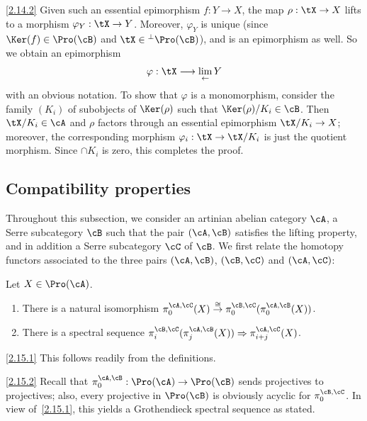 \begin{proofc}
\begin{laststep}{\eqref{2.14.2}}
Given such an essential epimorphism $f : Y \to X$, the map $\rho : \tX \to X$ lifts to a morphism $\varphi_Y : \tX \to Y$. Moreover, $\varphi_Y$ is unique (since $\Ker(f) \in \Pro(\cB)$ and $\tX \in {^{\perp} \Pro(\cB)}$), and is an epimorphism as well. So we obtain an epimorphism
\[
\varphi : \tX \longrightarrow
\lim_{\leftarrow} Y
\]
with an obvious notation. To show that $\varphi$ is a monomorphism, consider the family $(K_i)$ of subobjects of $\Ker(\rho)$ such that $\Ker(\rho)/K_i \in \cB$. Then $\tX/K_i \in \cA$ and $\rho$ factors through an essential epimorphism $\tX/K_i \to X$; moreover, the corresponding morphism $\varphi_i : \tX \to \tX/K_i$ is just the quotient morphism. Since $\cap K_i$ is zero, this completes the proof.
\end{laststep}
\let\qed\relax
\end{proofc}

\subsection{Compatibility properties}\label{subsec:compatibility}

Throughout this subsection, we consider an artinian abelian category $\cA$, a Serre subcategory $\cB$ such that the pair $(\cA,\cB)$ satisfies the lifting property, and in addition a Serre subcategory $\cC$ of $\cB$. We first relate the homotopy functors associated to the three pairs $(\cA,\cB)$, $(\cB,\cC)$ and $(\cA,\cC)$:

\begin{lemm}\label{lem:comp}
Let $X \in \Pro(\cA)$.
\begin{enumerate}\romanenumi
\item \label{2.15.1} There is a natural isomorphism $\pi_0^{\cA,\cC}(X) \stackrel{\cong}{\to}
\pi_0^{\cB,\cC} (\pi_0^{\cA,\cB}(X))$.
\item \label{2.15.2} There is a spectral sequence $\pi_i^{\cB,\cC} (\pi_j^{\cA,\cB}(X)) \Rightarrow
\pi_{i+j}^{\cA,\cC}(X)$.
\end{enumerate}
\end{lemm}

\begin{proofc}
\begin{step}{\eqref{2.15.1}}%
This follows readily from the definitions.
\end{step}

\begin{laststep}{\eqref{2.15.2}}%
Recall that $\pi_0^{\cA,\cB} : \Pro(\cA) \to \Pro(\cB)$ sends projectives to projectives; also, every projective in $\Pro(\cB)$ is obviously acyclic for $\pi_0^{\cB,\cC}$. In view of~\eqref{2.15.1}, this yields a Grothendieck spectral sequence as stated.
\end{laststep}
\let\qed\relax
\end{proofc}

